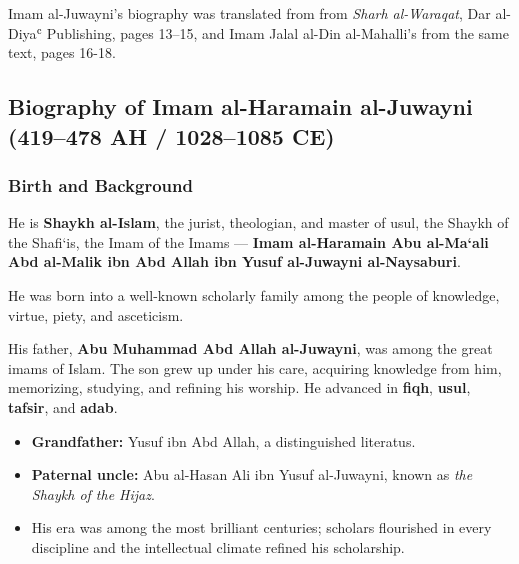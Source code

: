 \documentclass[
  a4paper,
  DIV=11,
  numbers=noendperiod]{scrartcl}
\providecommand{\tightlist}{%
  \setlength{\itemsep}{0pt}\setlength{\parskip}{0pt}}
\begin{document}
\begin{tcolorbox}[enhanced jigsaw, left=2mm, colframe=quarto-callout-note-color-frame, bottomrule=.15mm, titlerule=0mm, toprule=.15mm, opacityback=0, breakable, toptitle=1mm, colbacktitle=quarto-callout-note-color!10!white, rightrule=.15mm, title=\textcolor{quarto-callout-note-color}{\faInfo}\hspace{0.5em}{Source}, arc=.35mm, bottomtitle=1mm, leftrule=.75mm, opacitybacktitle=0.6, colback=white, coltitle=black]

Imam al-Juwayni's biography was translated from from \emph{Sharh
al-Waraqat}, Dar al-Diyaʿ Publishing, pages 13--15, and Imam Jalal
al-Din al-Mahalli's from the same text, pages 16-18.

\end{tcolorbox}

\subsection{Biography of Imam al-Haramain al-Juwayni (419--478 AH /
1028--1085
CE)}\label{biography-of-imam-al-haramain-al-juwayni-419478-ah-10281085-ce}

\subsubsection{Birth and Background}\label{birth-and-background}

He is \textbf{Shaykh al-Islam}, the jurist, theologian, and master of
usul, the Shaykh of the Shafi`is, the Imam of the Imams --- \textbf{Imam
al-Haramain Abu al-Ma`ali Abd al-Malik ibn Abd Allah ibn Yusuf
al-Juwayni al-Naysaburi}.

He was born into a well-known scholarly family among the people of
knowledge, virtue, piety, and asceticism.

His father, \textbf{Abu Muhammad Abd Allah al-Juwayni}, was among the
great imams of Islam. The son grew up under his care, acquiring
knowledge from him, memorizing, studying, and refining his worship. He
advanced in \textbf{fiqh}, \textbf{usul}, \textbf{tafsir}, and
\textbf{adab}.

\begin{itemize}
\tightlist
\item
  \textbf{Grandfather:} Yusuf ibn Abd Allah, a distinguished
  literatus.\\
\item
  \textbf{Paternal uncle:} Abu al-Hasan Ali ibn Yusuf al-Juwayni, known
  as \emph{the Shaykh of the Hijaz}.\\
\item
  His era was among the most brilliant centuries; scholars flourished in
  every discipline and the intellectual climate refined his scholarship.
\end{itemize}
\end{document}
